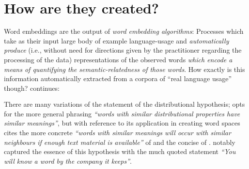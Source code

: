\documentclass{ucetd}
\begin{document}
\section{How are they created?}
Word embeddings are the output of \emph{word embedding algorithms}: Processes which take as their input large body of example language-usage and \emph{automatically produce} (i.e., without need for directions given by the practitioner regarding the processing of the data) representations of the observed words \emph{which encode a means of quantifying the semantic-relatedness of those words}.
How exactly is this information automatically extracted from a corpora of ``real language usage'' though? \citeauthor{sahlgreen-2006-the-word-space-model} continues:
\begin{definition}
There are many variations of the statement of the distributional hypothesis; \citeauthor{sahlgreen-2006-the-word-space-model} opts for the more general phrasing \emph{``words with similar distributional properties have similar meanings''}, but with reference to its application in creating word spaces cites the more concrete \emph{``words with similar meanings will occur with similar neighbours if enough text material is available''} of \textcite{schutze-1995-information-retrieval} and the concise  of \textcite{rubenstein-1965-contextual-correlates}. \textcite{firth-1957-a-syn-of-lin} notably captured the essence of this hypothesis with the much quoted statement \emph{``You will know a word by the company it keeps''}.
\end{definition}\label{def:distrib-hyp}
\end{document}
